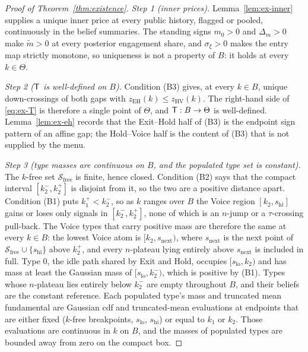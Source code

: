 \begin{proof}[Proof of Theorem~\ref{thm:existence}]
\emph{Step 1 (inner prices).} Lemma~\ref{lem:ex-inner} supplies a unique inner price at every public
history, flagged or pooled, continuously in the belief summaries. The standing signs $m_0>0$ and
$\Delta_m>0$ make $\tilde m>0$ at every posterior engagement share, and $\sigma_\xi>0$ makes the
entry map strictly monotone, so uniqueness is not a property of $B$: it holds at every $k\in\Theta$.

\emph{Step 2 ($\mathsf{T}$ is well-defined on $B$).} Condition (B3) gives, at every $k\in B$, unique
down-crossings of both gaps with $z_{\mathrm{EH}}(k)\le z_{\mathrm{HV}}(k)$. The right-hand side of
\eqref{eq:ex-T} is therefore a single point of $\Theta$, and $\mathsf{T}:B\to\Theta$ is well-defined.
Lemma~\ref{lem:ex-eh} records that the Exit--Hold half of (B3) is the endpoint sign pattern of an
affine gap; the Hold--Voice half is the content of (B3) that is not supplied by the menu.

\emph{Step 3 (type masses are continuous on $B$, and the populated type set is constant).} The
$k$-free set $\mathcal S_{\mathrm{free}}$ is finite, hence closed. Condition (B2) says that the
compact interval $[k_2^-,k_2^+]$ is disjoint from it, so the two are a positive distance apart.
Condition (B1) puts $k_1^+<k_2^-$, so as $k$ ranges over $B$ the Voice region $[k_2,s_{\mathrm{hi}}]$
gains or loses only signals in $[k_2^-,k_2^+]$, none of which is an $n$-jump or a $\tau$-crossing
pull-back. The Voice types that carry positive mass are therefore the same at every $k\in B$: the
lowest Voice atom is $[k_2,s_{\mathrm{next}})$, where $s_{\mathrm{next}}$ is the next point of
$\mathcal S_{\mathrm{free}}\cup\{s_{\mathrm{hi}}\}$ above $k_2^+$, and every $n$-plateau lying
entirely above $s_{\mathrm{next}}$ is included in full. Type $0$, the idle path shared by Exit and
Hold, occupies $[s_{\mathrm{lo}},k_2)$ and has mass at least the Gaussian mass of
$[s_{\mathrm{lo}},k_2^-)$, which is positive by (B1). Types whose $n$-plateau lies entirely below
$k_2^-$ are empty throughout $B$, and their beliefs are the constant reference. Each populated
type's mass and truncated mean fundamental are Gaussian cdf and truncated-mean evaluations at
endpoints that are either fixed ($k$-free breakpoints, $s_{\mathrm{lo}}$, $s_{\mathrm{hi}}$) or
equal to $k_1$ or $k_2$. Those evaluations are continuous in $k$ on $B$, and the masses of
populated types are bounded away from zero on the compact box.


\end{proof}
